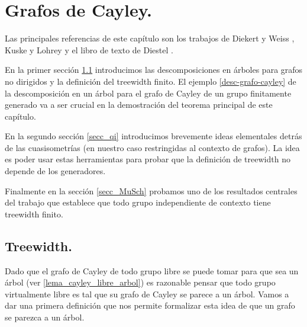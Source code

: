 \documentclass[tesis.tex]{subfiles}
\begin{document}
	
\chapter{Grafos de Cayley.} \label{seccion_treewidth}

Las principales referencias de este capítulo son los trabajos de Diekert y Weiss \cite{diekert2017context}, Kuske y Lohrey \cite{kuske2005logical} y el libro de texto de Diestel \cite{diestel2005graph}.

En la primer sección \ref{secc_tw} introducimos las descomposiciones en árboles para grafos no dirigidos y la definición del treewidth finito.
El ejemplo \ref{desc-grafo-cayley} de la descomposición en un árbol para el grafo de Cayley de un grupo finitamente generado va a ser crucial en la demostración del teorema principal de este capítulo.


En la segundo sección \ref{secc_qi} introducimos brevemente ideas elementales detrás de las cuasisometrías (en nuestro caso restringidas al contexto de grafos).
La idea es poder usar estas herramientas para probar que la definición de treewidth no depende de los generadores.

Finalmente en la sección \ref{secc_MuSch} probamos uno de los resultados centrales del trabajo que establece que todo grupo independiente de contexto tiene treewidth finito.



\section{Treewidth.}\label{secc_tw}

Dado que el grafo de Cayley de todo grupo libre se puede tomar para que sea un árbol (ver \ref{lema_cayley_libre_arbol}) es razonable pensar que todo grupo virtualmente libre es tal que su grafo de Cayley se parece a un árbol. 
Vamos a dar una primera definición que nos permite formalizar esta idea de que un grafo se parezca a un árbol.
\end{document}
